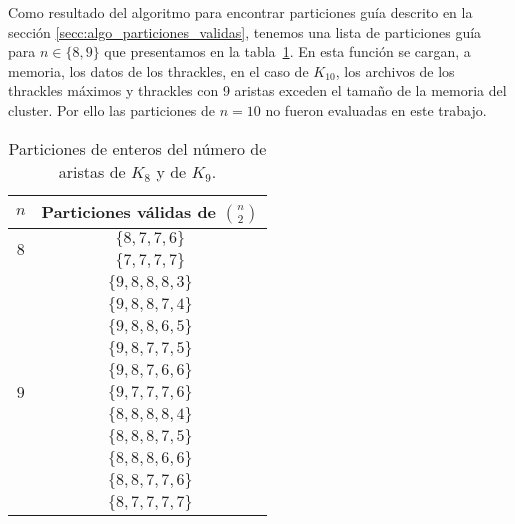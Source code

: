   Como resultado del algoritmo para encontrar particiones guía descrito en la sección
  \ref{secc:algo_particiones_validas}, tenemos una lista de particiones guía para
  $n\in\{8,9\}$ que presentamos en la tabla~\ref{tabla:particionesk8k9_2}. En esta función se
  cargan, a memoria, los datos de los thrackles, en el caso de $K_{10}$, los archivos de los
  thrackles máximos y thrackles con 9 aristas exceden el tamaño de la memoria del cluster. Por ello
  las particiones de $n=10$ no fueron evaluadas en este trabajo.
  \begin{table}[t]
    \centering
    \begin{tabular}{|c|c|}
      \hline
      $n$                       & Particiones válidas de $\displaystyle\binom{n}{2}$ \\ \hline\hline
      \multirow{2}{*}{$ 8 $}    & $\{8,7,7,6\}$ \\ \cline{2-2}
                                & $\{7,7,7,7\}$ \\ \hline
      \multirow{11}{*}{$ 9 $}   &$\{9,8,8,8,3\}$ \\ \cline{2-2}
                                &$\{9,8,8,7,4\}$ \\ \cline{2-2}
                                &$\{9,8,8,6,5\}$ \\ \cline{2-2}
                                &$\{9,8,7,7,5\}$ \\ \cline{2-2}
                                &$\{9,8,7,6,6\}$ \\ \cline{2-2}
                                &$\{9,7,7,7,6\}$ \\ \cline{2-2}
                                &$\{8,8,8,8,4\}$ \\ \cline{2-2}
                                &$\{8,8,8,7,5\}$ \\ \cline{2-2}
                                &$\{8,8,8,6,6\}$ \\ \cline{2-2}
                                &$\{8,8,7,7,6\}$ \\ \cline{2-2}
                                &$\{8,7,7,7,7\}$ \\ \hline
    \end{tabular}
    \caption{Particiones de enteros del número de aristas de $K_8$ y de $K_9$. }
    \label{tabla:particionesk8k9_2}
  \end{table}

